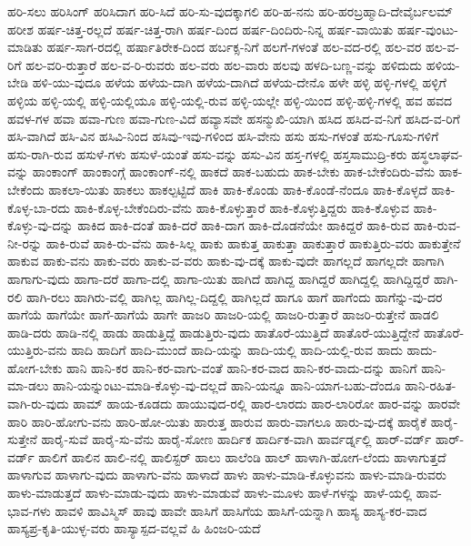 {ಹರಿ-ಸಲು
ಹರಿಸಿಂಗ್
ಹರಿಸಿದಾಗ
ಹರಿ-ಸಿದೆ
ಹರಿ-ಸು-ವುದಕ್ಕಾಗಲಿ
ಹರಿ-ಹ-ನನು
ಹರಿ-ಹರಬ್ರಹ್ಮಾದಿ-ದೇವೈರ್ಬಲಮ್
ಹರೀಶ
ಹರ್ಷ-ಚಿತ್ತ-ರಲ್ಲದೆ
ಹರ್ಷ-ಚಿತ್ತ-ರಾಗಿ
ಹರ್ಷ-ದಿಂದ
ಹರ್ಷ-ದಿಂದಿರು-ನಿನ್ನ
ಹರ್ಷ-ವಾಯಿತು
ಹರ್ಷ-ವುಂಟು-ಮಾಡಿತು
ಹರ್ಷ-ಸಾಗ-ರದಲ್ಲಿ
ಹರ್ಷಾತಿರೇಕ-ದಿಂದ
ಹರ್ಬಕ್ಸ-ನಿಗೆ
ಹಲಗೆ-ಗಳಂತೆ
ಹಲ-ವದ-ರಲ್ಲಿ
ಹಲ-ವರ
ಹಲ-ವ-ರಿಗೆ
ಹಲ-ವರಿ-ರುತ್ತಾರೆ
ಹಲ-ವ-ರಿ-ರುವರು
ಹಲ-ವರು
ಹಲ-ವಾರು
ಹಲವು
ಹಳದಿ-ಬಣ್ಣ-ವನ್ನು
ಹಳಿದುದು
ಹಳಿಯ-ಬೇಡಿ
ಹಳಿ-ಯು-ವುದೂ
ಹಳೆಯ
ಹಳೆಯ-ದಾಗಿ
ಹಳೆಯ-ದಾಗಿದೆ
ಹಳೆಯ-ದೇನೊ
ಹಳೇ
ಹಳ್ಳಿ
ಹಳ್ಳಿ-ಗಳಲ್ಲಿ
ಹಳ್ಳಿಗೆ
ಹಳ್ಳಿಯ
ಹಳ್ಳಿ-ಯಲ್ಲಿ
ಹಳ್ಳಿ-ಯಲ್ಲಿಯೂ
ಹಳ್ಳಿ-ಯಲ್ಲಿ-ರುವ
ಹಳ್ಳಿ-ಯಲ್ಲೇ
ಹಳ್ಳಿ-ಯಿಂದ
ಹಳ್ಳಿ-ಹಳ್ಳಿ-ಗಳಲ್ಲಿ
ಹವ
ಹವದ
ಹವಳ-ಗಳ
ಹವಾ
ಹವಾ-ಗುಣ
ಹವಾ-ಗುಣ-ವಿದೆ
ಹವ್ಯಾಸವೇ
ಹಸನ್ಮುಖಿ-ಯಾಗಿ
ಹಸಿದ
ಹಸಿದ-ವ-ನಿಗೆ
ಹಸಿದ-ವ-ರಿಗೆ
ಹಸಿ-ವಾಗಿದೆ
ಹಸಿ-ವಿನ
ಹಸಿವಿ-ನಿಂದ
ಹಸಿವು-ಇವು-ಗಳಿಂದ
ಹಸಿ-ವೇನು
ಹಸು
ಹಸು-ಗಳಂತೆ
ಹಸು-ಗೂಸು-ಗಳಿಗೆ
ಹಸು-ರಾಗಿ-ರುವ
ಹಸುಳೆ-ಗಳು
ಹಸುಳೆ-ಯಂತೆ
ಹಸು-ವನ್ನು
ಹಸು-ವಿನ
ಹಸ್ತ-ಗಳಲ್ಲಿ
ಹಸ್ತಸಾಮುದ್ರಿ-ಕರು
ಹಸ್ಥಲಾಘವ-ವನ್ನು
ಹಾಂಕಾಂಗ್
ಹಾಂಕಾಂಗ್ಗೆ
ಹಾಂಕಾಂಗ್-ನಲ್ಲಿ
ಹಾಕದೆ
ಹಾಕ-ಬಹುದು
ಹಾಕ-ಬೇಕು
ಹಾಕ-ಬೇಕೆಂದಿರು-ವೆನು
ಹಾಕ-ಬೇಕೆಂದು
ಹಾಕಲಾ-ಯಿತು
ಹಾಕಲು
ಹಾಕಲ್ಪಟ್ಟಿದೆ
ಹಾಕಿ
ಹಾಕಿ-ಕೊಂಡು
ಹಾಕಿ-ಕೊಂಡೆ-ನೆಂದೂ
ಹಾಕಿ-ಕೊಳ್ಳದೆ
ಹಾಕಿ-ಕೊಳ್ಳ-ಬಾ-ರದು
ಹಾಕಿ-ಕೊಳ್ಳ-ಬೇಕೆಂದಿರು-ವೆನು
ಹಾಕಿ-ಕೊಳ್ಳುತ್ತಾರೆ
ಹಾಕಿ-ಕೊಳ್ಳುತ್ತಿದ್ದರು
ಹಾಕಿ-ಕೊಳ್ಳುವ
ಹಾಕಿ-ಕೊಳ್ಳು-ವು-ದನ್ನು
ಹಾಕಿದ
ಹಾಕಿ-ದಂತೆ
ಹಾಕಿ-ದರೆ
ಹಾಕಿ-ದಾಗ
ಹಾಕಿ-ದೊಡನೆಯೇ
ಹಾಕಿದ್ದರೆ
ಹಾಕಿ-ರುವ
ಹಾಕಿ-ರುವ-ನೀ-ರನ್ನು
ಹಾಕಿ-ರುವೆ
ಹಾಕಿ-ರು-ವೆನು
ಹಾಕಿ-ಸಿಲ್ಲ
ಹಾಕು
ಹಾಕುತ್ತ
ಹಾಕುತ್ತಾ
ಹಾಕುತ್ತಾರೆ
ಹಾಕುತ್ತಿರು-ವರು
ಹಾಕುತ್ತೇನೆ
ಹಾಕುವ
ಹಾಕು-ವನು
ಹಾಕು-ವರು
ಹಾಕು-ವ-ವರು
ಹಾಕು-ವು-ದಕ್ಕೆ
ಹಾಕು-ವುದೇ
ಹಾಗಲ್ಲದೆ
ಹಾಗಲ್ಲದೇ
ಹಾಗಾಗಿ
ಹಾಗಾಗು-ವುದು
ಹಾಗಾ-ದರೆ
ಹಾಗಾ-ದಲ್ಲಿ
ಹಾಗಾ-ಯಿತು
ಹಾಗಿದೆ
ಹಾಗಿದ್ದ
ಹಾಗಿದ್ದರೆ
ಹಾಗಿದ್ದಲ್ಲಿ
ಹಾಗಿದ್ದಿದ್ದರೆ
ಹಾಗಿ-ರಲಿ
ಹಾಗಿ-ರಲು
ಹಾಗಿರು-ವಲ್ಲಿ
ಹಾಗಿಲ್ಲ
ಹಾಗಿಲ್ಲ-ದಿದ್ದಲ್ಲಿ
ಹಾಗಿಲ್ಲದೆ
ಹಾಗೂ
ಹಾಗೆ
ಹಾಗೆಂದು
ಹಾಗೆನ್ನು-ವು-ದರ
ಹಾಗೆಯೆ
ಹಾಗೆಯೇ
ಹಾಗೆ-ಹಾಗೆಯೆ
ಹಾಗೇ
ಹಾಜರಿ
ಹಾಜರಿ-ಯಲ್ಲಿ
ಹಾಜರಿ-ರುತ್ತಾರೆ
ಹಾಜರಿ-ರುತ್ತೇನೆ
ಹಾಡಲಿ
ಹಾಡಿ-ದರು
ಹಾಡಿ-ನಲ್ಲಿ
ಹಾಡು
ಹಾಡುತ್ತಿದ್ದೆ
ಹಾಡುತ್ತಿರು-ವುದು
ಹಾತೊರೆ-ಯುತ್ತಿದೆ
ಹಾತೊರೆ-ಯುತ್ತಿದ್ದೇನೆ
ಹಾತೊರೆ-ಯುತ್ತಿರು-ವನು
ಹಾದಿ
ಹಾದಿಗೆ
ಹಾದಿ-ಮುಂದೆ
ಹಾದಿ-ಯನ್ನು
ಹಾದಿ-ಯಲ್ಲಿ
ಹಾದಿ-ಯಲ್ಲಿ-ರುವ
ಹಾದು
ಹಾದು-ಹೋಗ-ಬೇಕು
ಹಾನಿ
ಹಾನಿ-ಕರ
ಹಾನಿ-ಕರ-ವಾಗು-ವಂತೆ
ಹಾನಿ-ಕರ-ವಾದ
ಹಾನಿ-ಕರ-ವಾದು-ದನ್ನು
ಹಾನಿಗೆ
ಹಾನಿ-ಮಾ-ಡಲು
ಹಾನಿ-ಯನ್ನುಂಟು-ಮಾಡಿ-ಕೊಳ್ಳು-ವು-ದಲ್ಲದೆ
ಹಾನಿ-ಯನ್ನೂ
ಹಾನಿ-ಯಾಗ-ಬಹು-ದೆಂದೂ
ಹಾನಿ-ರಹಿತ-ವಾಗಿ-ರು-ವುದು
ಹಾಮ್
ಹಾಯ-ಕೂಡದು
ಹಾಯುವುದ-ರಲ್ಲಿ
ಹಾರ-ಲಾರದು
ಹಾರ-ಲಾರಿರೋ
ಹಾರ-ವನ್ನು
ಹಾರವೇ
ಹಾರಿ
ಹಾರಿ-ಹೋಗು-ವನು
ಹಾರಿ-ಹೋ-ಯಿತು
ಹಾರುತ್ತ
ಹಾರುವ
ಹಾರು-ವಾಗಲೂ
ಹಾರು-ವು-ದಕ್ಕೆ
ಹಾರೈಕೆ
ಹಾರೈ-ಸುತ್ತೇನೆ
ಹಾರೈ-ಸುವೆ
ಹಾರೈ-ಸು-ವೆನು
ಹಾರೈ-ಸೋಣ
ಹಾರ್ದಿಕ
ಹಾರ್ದಿಕ-ವಾಗಿ
ಹಾರ್ವರ್ಡ್ನಲ್ಲಿ
ಹಾರ್-ವರ್ಡ್
ಹಾರ್-ವರ್ಡ್
ಹಾಲಿಗೆ
ಹಾಲಿನ
ಹಾಲಿ-ನಲ್ಲಿ
ಹಾಲಿಸ್ಟರ್
ಹಾಲು
ಹಾಲೆಂಡಿ
ಹಾಲ್
ಹಾಳಾಗಿ-ಹೋಗ-ಲೆಂದು
ಹಾಳಾಗುತ್ತದೆ
ಹಾಳಾಗುವ
ಹಾಳಾಗು-ವುದು
ಹಾಳಾಗು-ವೆನು
ಹಾಳಾದೆ
ಹಾಳು
ಹಾಳು-ಮಾಡಿ-ಕೊಳ್ಳುವನು
ಹಾಳು-ಮಾಡಿ-ರುವರು
ಹಾಳು-ಮಾಡುತ್ತದೆ
ಹಾಳು-ಮಾಡು-ವುದು
ಹಾಳು-ಮಾಡುವೆ
ಹಾಳು-ಮೂಳು
ಹಾಳೆ-ಗಳನ್ನು
ಹಾಳೆ-ಯಲ್ಲಿ
ಹಾವ-ಭಾವ-ಗಳು
ಹಾವಳಿ
ಹಾವಿಸ್ಮಿಸ್
ಹಾವು
ಹಾವೇ
ಹಾಸಿಗೆ
ಹಾಸಿಗೆಯ
ಹಾಸಿಗೆ-ಯನ್ನಾಗಿ
ಹಾಸ್ಯ
ಹಾಸ್ಯ-ಕರ-ವಾದ
ಹಾಸ್ಯಪ್ರ-ಕೃತಿ-ಯುಳ್ಳ-ವರು
ಹಾಸ್ಯಾಸ್ಪದ-ವಲ್ಲವೆ
ಹಿ
ಹಿಂಜರಿ-ಯದೆ
}
